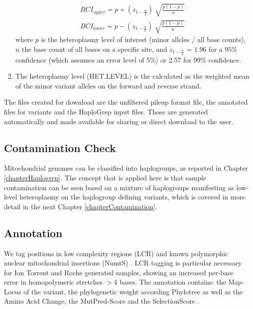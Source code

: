 \begin{enumerate}
\begin{equation}
\begin{split}
  BCI_{upper} = p + \left(z_{1- \frac{\alpha}{2}} \right)\sqrt[]{\frac{p (1-p)}{n} } \\ 
  BCI_{lower} = p - \left(z_{1- \frac{\alpha}{2}} \right)\sqrt[]{\frac{p (1-p)}{n} } 
\end{split}
\end{equation}
where $p$ is the heteroplasmy level of interest (minor alleles / all base counts), $n$ the base count of all bases on a specific site, and  $z_{1- \frac{\alpha}{2}}$ = $1.96$ for a $95\%$ confidence (which assumes an error level of 5\%) or 2.57 for 99\% confidence.
\item The heteroplasmy level (HET.LEVEL) is the calculated as the weighted mean of the minor variant alleles on the forward and reverse strand. 
\end{enumerate}
The files created for download are the unfiltered pileup format file, the annotated files for variants and the HaploGrep input files. Those are generated automatically and made available for sharing or direct download to the user.
\subsection{Contamination Check}
Mitochondrial genomes can be classified into haplogroups, as reported in Chapter \ref{chapterHaplogrep}. The concept that is applied here is that sample contamination can be seen based on a mixture of haplogroups manifesting as low-level heteroplasmy on the haplogroup defining variants, which is covered in more detail in the next Chapter \ref{chapterContamination}. 
\subsection{Annotation}\label{subs:annotation}
We tag positions in low complexity regions (LCR) \cite{Zhidkov2011} and known polymorphic nuclear mitochondrial insertions (NumtS) \cite{Dayama2014}. LCR tagging is particular necessary for Ion Torrent and Roche generated samples, showing an increased per-base error in homopolymeric stretches $>$4 bases.  The annotation contains: the Map-Locus of the variant, the phylogenetic weight according Phylotree \cite{VanOven2009} as well as the Amino Acid Change, the MutPred-Score \cite{Li-mutpred2009} and the SelectionScore \cite{Pereira2011}.
